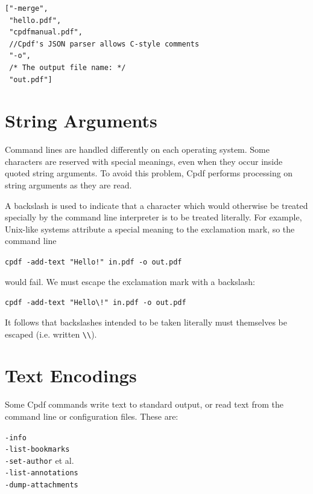 \documentclass{book}
\begin{document}
\begin{framed}
{\small\begin{verbatim}
["-merge",
 "hello.pdf",
 "cpdfmanual.pdf",
 //Cpdf's JSON parser allows C-style comments
 "-o",
 /* The output file name: */
 "out.pdf"]
\end{verbatim}}\end{framed}

\section{String Arguments}
Command lines are handled differently on each operating system. Some
characters are reserved with special meanings, even when they occur inside
quoted string arguments. To avoid this problem, Cpdf performs processing on
string arguments as they are read.

A backslash is used to indicate that a character which would otherwise be
treated specially by the command line interpreter is to be treated literally. For
example, Unix-like systems attribute a special meaning to the exclamation mark, so
the command line

\begin{framed}
 \noindent\small\verb?cpdf -add-text "Hello!" in.pdf -o out.pdf?
\end{framed}

\noindent would fail. We must escape the exclamation mark with a backslash:

\begin{framed}
 \noindent\small\verb?cpdf -add-text "Hello\!" in.pdf -o out.pdf?
\end{framed}

\noindent It follows that backslashes intended to be taken literally must themselves be
escaped (i.e. written \verb!\\!).

\section{Text Encodings}
\label{textencodings}

Some Cpdf commands write text to standard output, or read text from
the command line or configuration files. These are:

\begin{framed}
  \noindent\small\verb!-info!\\
  \noindent\small\verb!-list-bookmarks!\\
  \noindent\small\verb!-set-author! et al.\\
  \noindent\small\verb!-list-annotations!\\
  \noindent\small\verb!-dump-attachments!
\end{framed}
\end{document}
